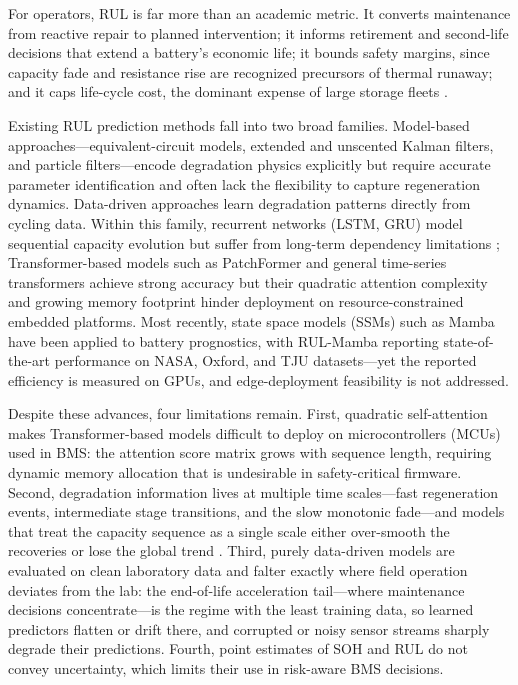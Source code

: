For operators, RUL is far more than an academic metric. It converts
maintenance from reactive repair to planned intervention; it informs
retirement and second-life decisions that extend a battery's
economic life; it bounds safety margins, since capacity fade and
resistance rise are recognized precursors of thermal runaway; and it
caps life-cycle cost, the dominant expense of large storage fleets
\cite{ref_yang_review,ref_qu_bess}.

Existing RUL prediction methods fall into two broad families.
Model-based approaches---equivalent-circuit models, extended and
unscented Kalman filters, and particle filters---encode degradation
physics explicitly \cite{ref_ekf_yan,ref_upf_cong,ref_pf_echem,
ref_pf_rbf,ref_pf_lui} but require accurate parameter identification
and often lack the flexibility to capture regeneration dynamics.
Data-driven approaches learn degradation patterns directly from
cycling data. Within this family, recurrent networks (LSTM, GRU)
\cite{ref_lstm_transformer,ref_lstm_rul_zhang,ref_gru_ding} model
sequential capacity evolution but suffer from long-term dependency
limitations \cite{ref_rulmamba}; Transformer-based models
\cite{ref_vaswani} such as PatchFormer \cite{ref_patchformer}
and general time-series transformers \cite{ref_autoformer}
\cite{ref_fedformer} achieve strong accuracy but their quadratic
attention complexity and growing memory footprint hinder deployment
on resource-constrained embedded platforms. Most recently, state
space models (SSMs) such as Mamba \cite{ref_mamba} have been applied
to battery prognostics, with RUL-Mamba \cite{ref_rulmamba} reporting
state-of-the-art performance on NASA, Oxford, and TJU datasets---yet
the reported efficiency is measured on GPUs, and edge-deployment
feasibility is not addressed.

Despite these advances, four limitations remain. First, quadratic
self-attention makes Transformer-based models difficult to deploy on
microcontrollers (MCUs) used in BMS: the attention score matrix grows
with sequence length, requiring dynamic memory allocation that is
undesirable in safety-critical firmware. Second, degradation
information lives at multiple time scales---fast regeneration
events, intermediate stage transitions, and the slow monotonic
fade---and models that treat the capacity sequence as a single scale
either over-smooth the recoveries or lose the global trend
\cite{ref_omnitie}. Third, purely data-driven models are evaluated on clean
laboratory data and falter exactly where field operation deviates
from the lab: the end-of-life acceleration tail---where maintenance
decisions concentrate---is the regime with the least training data,
so learned predictors flatten or drift there, and corrupted or noisy
sensor streams sharply degrade their predictions. Fourth, point
estimates of SOH and RUL do not convey uncertainty, which limits
their use in risk-aware BMS decisions.

